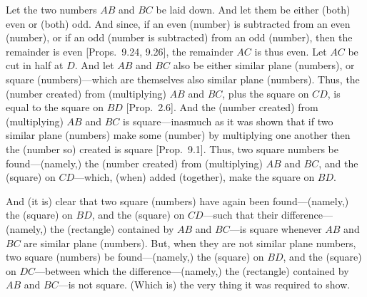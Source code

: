\begin{Parallel}{}{}
{Let the two numbers $AB$ and $BC$ be laid down. And let them
be either (both)  even or (both) odd. And since, if an even (number) is subtracted
from an even (number), or if an odd (number is subtracted) from an odd
(number), then the remainder is even [Props.~9.24, 9.26], the remainder $AC$ is thus even. Let
$AC$ be cut in half at $D$. And let $AB$ and $BC$ also be
either similar plane (numbers), or square (numbers)---which are themselves
also similar plane (numbers). Thus, the (number created) from (multiplying)  $AB$ and
$BC$, plus the square on $CD$, is equal to the square on $BD$ [Prop.~2.6].  And the (number created) from (multiplying) $AB$ and $BC$ is square---inasmuch as it was shown that
if two similar plane (numbers) make some (number) by multiplying
one another then the (number so) created is square [Prop.~9.1]. Thus, two square numbers be
found---(namely,) the (number created) from (multiplying) $AB$ and $BC$,
and the (square) on $CD$---which, (when) added (together),
make the square on $BD$.

And (it is) clear that two square (numbers) have again been found---(namely,) the (square) on $BD$, and the (square) on $CD$---such that their difference---(namely,) the (rectangle) contained by $AB$ and $BC$---is  square
whenever $AB$ and $BC$ are similar plane (numbers). But, when they are
not similar plane numbers, two square (numbers) be found---(namely,) the (square) on $BD$, and the (square) on $DC$---between which the difference---(namely,) the (rectangle) contained by $AB$ and $BC$---is
not  square. (Which is) the very thing it was required to show.}
\end{Parallel}

